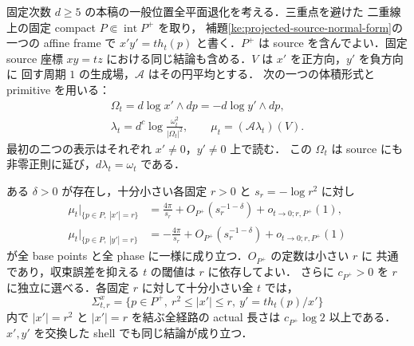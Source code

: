 \begin{lemma}
\label{ke:source-inclusive-fixed-shell}
固定次数 $d\ge5$ の本稿の一般位置全平面退化を考える．三重点を避けた
二重線上の固定 compact $P\Subset\operatorname{int}P^+$ を取り，
補題\ref{ke:projected-source-normal-form}の一つの affine frame で
$x'y'=t h_t(p)$ と書く．$P^+$ は source を含んでよい．固定 source 座標
$xy=tz$ における同じ結論も含める．$V$ は $x'$ を正方向，$y'$ を負方向に
回す周期 $1$ の生成場，$\mathcal A$ はその円平均とする．
次の一つの体積形式と primitive を用いる：
\begin{equation}\label{ke:eq:source-inclusive-fixed-frame}
\begin{aligned}
 \Omega_t=d\log x'\wedge dp=-d\log y'\wedge dp,
 \\
 \lambda_t=d^c\log\frac{\omega_t^2}{|\Omega_t|^2},
 \qquad \mu_t=(\mathcal A\lambda_t)(V).
\end{aligned}
\end{equation}
最初の二つの表示はそれぞれ $x'\ne0$，$y'\ne0$ 上で読む．
この $\Omega_t$ は source にも非零正則に延び，$d\lambda_t=\omega_t$ である．

ある $\delta>0$ が存在し，十分小さい各固定 $r>0$ と $s_r=-\log r^2$ に対し
\begin{align}
 \mu_t|_{\{p\in P,\ |x'|=r\}}
   &=\frac{4\pi}{s_r}+O_{P^+}(s_r^{-1-\delta})+o_{t\to0;r,P^+}(1),
       \label{ke:eq:source-inclusive-positive-end}\\
 \mu_t|_{\{p\in P,\ |y'|=r\}}
   &=-\frac{4\pi}{s_r}+O_{P^+}(s_r^{-1-\delta})+o_{t\to0;r,P^+}(1)
       \label{ke:eq:source-inclusive-negative-end}
\end{align}
が全 base points と全 phase に一様に成り立つ．$O_{P^+}$ の定数は小さい $r$ に
共通であり，収束誤差を抑える $t$ の閾値は $r$ に依存してよい．
さらに $c_{P^+}>0$ を $r$ に独立に選べる．各固定 $r$ に対して十分小さい全 $t$ では，
\[
 \Sigma^x_{t,r}=\{p\in P^+,\ r^2\le|x'|\le r,\ y'=t h_t(p)/x'\}
\]
内で $|x'|=r^2$ と $|x'|=r$ を結ぶ全経路の actual 長さは
$c_{P^+}\log2$ 以上である．$x',y'$ を交換した shell でも同じ結論が成り立つ．
\end{lemma}


